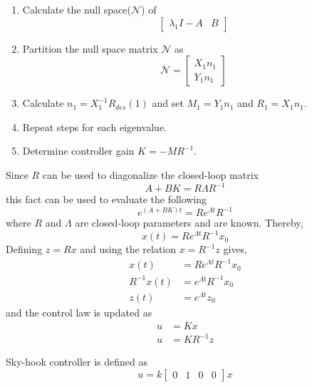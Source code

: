 \begin{enumerate}
    \item Calculate the null space($\mathcal{N}$) of 
    \begin{equation}
        \begin{bmatrix}
            \lambda_1I-A& B
        \end{bmatrix}
    \end{equation}
    \item Partition the null space matrix $\mathcal{N}$ as 
    \begin{equation}
        \mathcal{N}=\begin{bmatrix}X_1n_1\\Y_1n_1\end{bmatrix}
    \end{equation}
    \item Calculate $n_1=X_1^{-1}R_{des}(1)$ and set $M_1=Y_1n_1$ and $R_1=X_1n_1$.
    \item Repeat steps for each eigenvalue.
    \item Determine controller gain $K=-MR^{-1}$.
\end{enumerate}

Since $R$ can be used to diagonalize the closed-loop matrix
\begin{equation}
    A+BK=R\Lambda R^{-1}
\end{equation}
this fact can be used to evaluate the following
\begin{equation}
    e^{(A+BK)t}=Re^{\Lambda t} R^{-1}
\end{equation}
where $R$ and $\Lambda$ are closed-loop parameters and are known. Thereby,
\begin{equation}
    x(t)=Re^{\Lambda t} R^{-1}x_0
\end{equation}
Defining $z=Rx$ and using the relation $x=R^{-1}z$ gives,
\begin{equation}
\begin{split}
    x(t)&=Re^{\Lambda t} R^{-1}x_0\\
    R^{-1}x(t)&=e^{\Lambda t} R^{-1}x_0\\
    z(t)&=e^{\Lambda t} z_0
\end{split}
\end{equation}
and the control law is updated as 
\begin{equation}
\begin{split}
    u&=Kx\\
    u&=KR^{-1}z
\end{split}
\end{equation}

Sky-hook controller is defined as 
\begin{equation}
    u=k\begin{bmatrix}0& 1& 0& 0\end{bmatrix}x
\end{equation}

